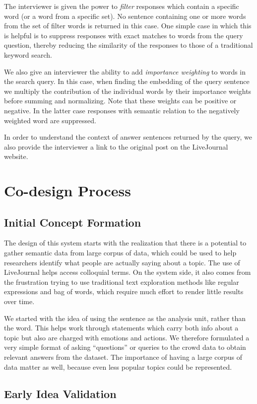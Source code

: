 \documentclass{sigchi}
\begin{document}
The interviewer is given the power to {\em filter} responses which contain a specific word (or a word from a specific set). No sentence  containing one or more words from the set of filter words is returned in this case. One simple case in which this is helpful is to suppress responses with exact matches to words from the query question, thereby reducing the similarity of the responses to those of a traditional keyword search.

We also give an interviewer the ability to add {\em importance weighting} to words in the search query. In this case, when finding the embedding of the query sentence we multiply the contribution of the individual words by their importance weights before summing and normalizing. Note that these weights can be positive or negative. In the latter case responses with semantic relation to the negatively weighted word are suppressed.

In order to understand the context of answer sentences returned by the query, we also provide the interviewer a link to the original post on the LiveJournal website. 

\section{Co-design Process}
\subsection{Initial Concept Formation}
The design of this system starts with the realization that there is a potential to gather semantic data from large corpus of data, which could be used to help researchers identify what people are actually saying about a topic. The use of LiveJournal helps access colloquial terms. On the system side, it also comes from the frustration trying to use traditional text exploration methods like regular expressions and bag of words, which require much effort to render little results over time.

We started with the idea of using the sentence as the analysis unit, rather than the word. This helps work through statements which carry both info about a topic but also are charged with emotions and actions. We therefore formulated a very simple format of asking ``questions'' or queries to the crowd data to obtain relevant answers from the dataset. The importance of having a large corpus of data matter as well, because even less popular topics could be represented. 

\subsection{Early Idea Validation}
\end{document}
